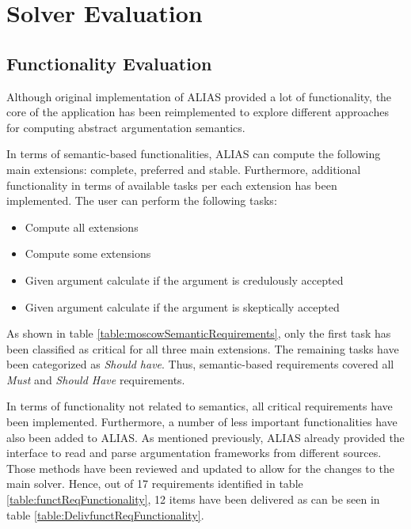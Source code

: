\section{Solver Evaluation}

\subsection{Functionality Evaluation}
Although original implementation of ALIAS provided a lot of functionality, the core of the application has been reimplemented to explore different approaches for computing abstract argumentation semantics. 

In terms of semantic-based functionalities, ALIAS can compute the following main extensions: complete, preferred and stable. Furthermore, additional functionality in terms of available tasks per each extension has been implemented. The user can perform the following tasks:
\begin{itemize}
	\item Compute all extensions
	\item Compute some extensions
	\item Given argument calculate if the argument is credulously accepted 
	\item Given argument calculate if the argument is skeptically accepted
\end{itemize}

As shown in table \ref{table:moscowSemanticRequirements}, only the first task has been classified as critical for all three main extensions. The remaining tasks have been categorized as \textit{Should have}. Thus, semantic-based requirements covered all \textit{Must} and \textit{Should Have} requirements.

In terms of functionality not related to semantics, all critical requirements have been implemented. Furthermore, a number of less important functionalities have also been added to ALIAS. As mentioned previously, ALIAS already provided the interface to read and parse argumentation frameworks from different sources. Those methods have been reviewed and updated to allow for the changes to the main solver. Hence, out of 17 requirements identified in table \ref{table:functReqFunctionality}, 12 items have been delivered as can be seen in table \ref{table:DelivfunctReqFunctionality}.

